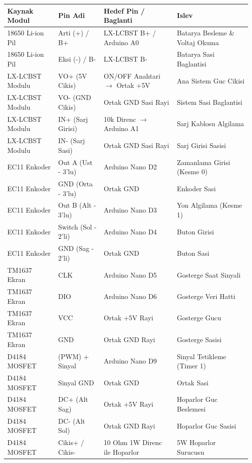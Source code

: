 \documentclass[12pt,a4paper]{article}
\begin{document}
\begin{table}[h!]
\centering
\begin{tabular}{|l|l|l|l|}
\hline
\textbf{Kaynak Modul} & \textbf{Pin Adi} & \textbf{Hedef Pin / Baglanti} & \textbf{Islev} \\ \hline
18650 Li-ion Pil & Arti (+) / B+ & LX-LCBST B+ / Arduino A0 & Batarya Besleme \& Voltaj Okuma \\
18650 Li-ion Pil & Eksi (-) / B- & LX-LCBST B- & Batarya Sasi Baglantisi \\
LX-LCBST Modulu & VO+ (5V Cikis) & ON/OFF Anahtari $\rightarrow$ Ortak +5V & Ana Sistem Guc Cikisi \\
LX-LCBST Modulu & VO- (GND Cikis) & Ortak GND Sasi Rayi & Sistem Sasi Baglantisi \\
LX-LCBST Modulu & IN+ (Sarj Girisi) & 10k Direnc $\rightarrow$ Arduino A1 & Sarj Kablosu Algilama \\
LX-LCBST Modulu & IN- (Sarj Sasi) & Ortak GND Sasi Rayi & Sarj Girisi Sasisi \\ \hline
EC11 Enkoder & Out A (Ust - 3'lu) & Arduino Nano D2 & Zamanlama Girisi (Kesme 0) \\
EC11 Enkoder & GND (Orta - 3'lu) & Ortak GND & Enkoder Sasi \\
EC11 Enkoder & Out B (Alt - 3'lu) & Arduino Nano D3 & Yon Algilama (Kesme 1) \\
EC11 Enkoder & Switch (Sol - 2'li) & Arduino Nano D4 & Buton Girisi \\
EC11 Enkoder & GND (Sag - 2'li) & Ortak GND & Buton Sasi \\ \hline
TM1637 Ekran & CLK & Arduino Nano D5 & Gosterge Saat Sinyali \\
TM1637 Ekran & DIO & Arduino Nano D6 & Gosterge Veri Hatti \\
TM1637 Ekran & VCC & Ortak +5V Rayi & Gosterge Gucu \\
TM1637 Ekran & GND & Ortak GND Rayi & Gosterge Sasisi \\ \hline
D4184 MOSFET & (PWM) + Sinyal & Arduino Nano D9 & Sinyal Tetikleme (Timer 1) \\
D4184 MOSFET & Sinyal GND & Ortak GND & Ortak Sasi \\
D4184 MOSFET & DC+ (Alt Sag) & Ortak +5V Rayi & Hoparlor Guc Beslemesi \\
D4184 MOSFET & DC- (Alt Sol) & Ortak GND Rayi & Hoparlor Guc Sasisi \\
D4184 MOSFET & Cikis+ / Cikis- & 10 Ohm 1W Direnc ile Hoparlor & 5W Hoparlor Surucusu \\ \hline
\end{tabular}
\end{table}
\end{document}
